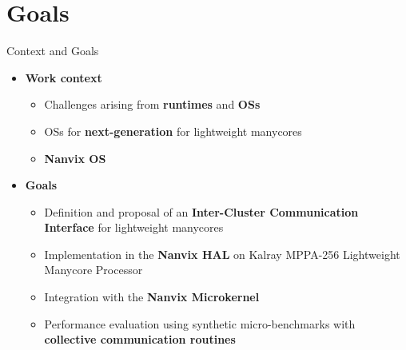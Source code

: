 \section{Goals}

	\begin{frame}[fragile]{Context and Goals}
		\begin{itemize}
			\item \textbf{Work context}
			\begin{itemize}
				\setlength \itemsep{0.3em}

				\item Challenges arising from \textbf{runtimes} and \textbf{OSs}
				\item OSs for \textbf{next-generation} for lightweight manycores
				\item \textbf{Nanvix OS}
			\end{itemize}
		\end{itemize}

		\begin{itemize}
			\item \textbf{Goals}
			\begin{itemize}
				\setlength \itemsep{0.3em}

				\item Definition and proposal of an \textbf{Inter-Cluster Communication Interface} for lightweight manycores
				\item Implementation in the \textbf{Nanvix HAL} on Kalray MPPA-256 Lightweight Manycore Processor
				\item Integration with the \textbf{Nanvix Microkernel}
				\item Performance evaluation using synthetic micro-benchmarks with \textbf{collective communication routines}
			\end{itemize}
		\end{itemize}

	\end{frame}

		

